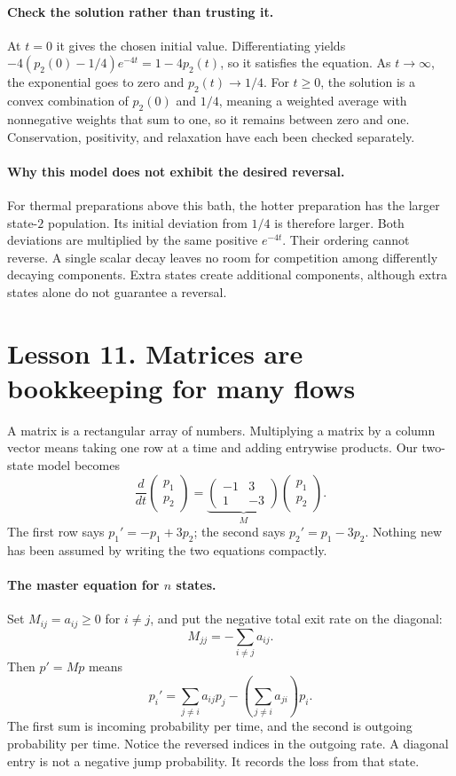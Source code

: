 \paragraph{Check the solution rather than trusting it.}
At $t=0$ it gives the chosen initial value. Differentiating yields
$-4(p_2(0)-1/4)e^{-4t}=1-4p_2(t)$, so it satisfies the equation.
As $t\to\infty$, the exponential goes to zero and $p_2(t)\to1/4$.
For $t\geq0$, the solution is a convex combination of $p_2(0)$ and $1/4$,
meaning a weighted average with nonnegative weights that sum to one,
so it remains between zero and one. Conservation, positivity, and relaxation
have each been checked separately.

\paragraph{Why this model does not exhibit the desired reversal.}
For thermal preparations above this bath, the hotter preparation has the
larger state-$2$ population. Its initial deviation from $1/4$ is therefore
larger. Both deviations are multiplied by the same positive $e^{-4t}$.
Their ordering cannot reverse. A single scalar decay leaves no room for
competition among differently decaying components. Extra states create
additional components, although extra states alone do not guarantee a reversal.

\clearpage
\section*{Lesson 11. Matrices are bookkeeping for many flows}
A matrix is a rectangular array of numbers. Multiplying a matrix by a column
vector means taking one row at a time and adding entrywise products.
Our two-state model becomes
\[
\frac{d}{dt}\begin{pmatrix}p_1\\p_2\end{pmatrix}
=\underbrace{\begin{pmatrix}-1&3\\1&-3\end{pmatrix}}_{M}
\begin{pmatrix}p_1\\p_2\end{pmatrix}.
\]
The first row says $p_1'=-p_1+3p_2$; the second says $p_2'=p_1-3p_2$.
Nothing new has been assumed by writing the two equations compactly.

\paragraph{The master equation for $n$ states.}
Set $M_{ij}=a_{ij}\geq0$ for $i\ne j$, and put the negative total exit rate
on the diagonal:
\[
M_{jj}=-\sum_{i\ne j}a_{ij}.
\]
Then $p'=Mp$ means
\[
p_i'=\sum_{j\ne i}a_{ij}p_j
-\left(\sum_{j\ne i}a_{ji}\right)p_i.
\]
The first sum is incoming probability per time, and the second is outgoing
probability per time. Notice the reversed indices in the outgoing rate.
A diagonal entry is not a negative jump probability. It records the loss
from that state.

